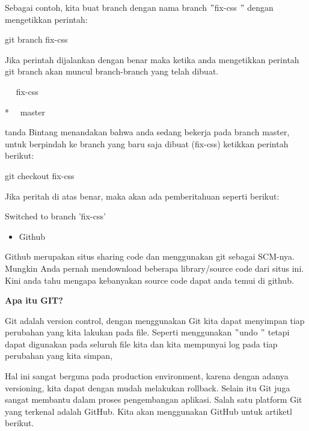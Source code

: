 \noindent 
Sebagai contoh, kita buat branch dengan nama branch  $ " $fix-css $ " $ dengan mengetikkan perintah: \par
\noindent 
 \hspace*{0.5in} git branch fix-css \par
\noindent 
Jika perintah dijalankan dengan benar maka ketika anda mengetikkan perintah git branch akan muncul branch-branch yang telah dibuat. \par
\noindent 
 \hspace*{0.5in} ~~ fix-css \par
\noindent 
 \hspace*{0.5in} *~~ master \par
\noindent 
tanda Bintang menandakan bahwa anda sedang bekerja pada branch master, untuk berpindah ke branch yang baru saja dibuat (fix-css) ketikkan perintah berikut: \par
\noindent 
 \hspace*{0.5in} git checkout fix-css \par
\noindent 
Jika peritah di atas benar, maka akan ada pemberitahuan seperti berikut: \par
\noindent 
 \hspace*{0.5in} Switched to branch 'fix-css' \par
\noindent 
\begin{itemize}
\item Github\end{itemize}
 \par
\noindent 
 \hspace*{0.5in} Github merupakan situs sharing code dan menggunakan git sebagai SCM-nya. Mungkin Anda pernah mendownload beberapa library/source code dari situs ini. Kini anda tahu mengapa kebanyakan source code dapat anda temui di github. \par
\vspace{12pt}
\noindent 
{\fontsize{14pt}{14pt}\selectfont \textbf{Apa itu GIT?} \\} \par
\noindent 
Git adalah version control, dengan menggunakan Git kita dapat menyimpan tiap perubahan yang kita lakukan pada file. Seperti menggunakan  $ " $undo $ " $ tetapi dapat digunakan pada seluruh file kita dan kita mempunyai log pada tiap perubahan yang kita simpan,  \par
\noindent 
Hal ini sangat berguna pada production environment, karena dengan adanya versioning, kita dapat dengan mudah melakukan rollback. Selain itu Git juga sangat membantu dalam proses pengembangan aplikasi. Salah satu platform Git yang terkenal adalah GitHub. Kita akan menggunakan GitHub untuk artiketl berikut. \par
